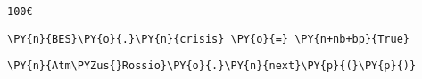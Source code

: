 \par\vspace{1\smallerfontscale}%
    \begin{addmargin}[\cellleftmargin]{0em}%
    {\smaller%
    \vspace{-1\smallerfontscale}%
    
    \begin{Verbatim}[commandchars=\\\{\}]
100€
    \end{Verbatim}
}%
    \end{addmargin}%

{\par%
\vspace{-1\baselineskip}%
}%
\begin{notebookcell}[16]%
\begin{addmargin}[\cellleftmargin]{0em}%
{\smaller%
\par%
%
\vspace{-1\smallerfontscale}%
\begin{Verbatim}[commandchars=\\\{\}]
\PY{n}{BES}\PY{o}{.}\PY{n}{crisis} \PY{o}{=} \PY{n+nb+bp}{True}
\end{Verbatim}
%
\par%
\vspace{-1\smallerfontscale}}%
\end{addmargin}
\end{notebookcell}



{\par%
\vspace{-1\baselineskip}%
}%
\begin{notebookcell}[18]%
\begin{addmargin}[\cellleftmargin]{0em}%
{\smaller%
\par%
%
\vspace{-1\smallerfontscale}%
\begin{Verbatim}[commandchars=\\\{\}]
\PY{n}{Atm\PYZus{}Rossio}\PY{o}{.}\PY{n}{next}\PY{p}{(}\PY{p}{)}
\end{Verbatim}
%
\par%
\vspace{-1\smallerfontscale}}%
\end{addmargin}
\end{notebookcell}

